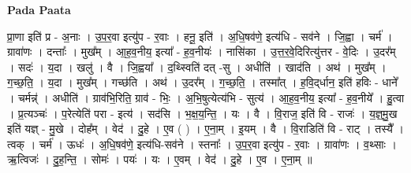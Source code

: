\documentclass[17pt]{extarticle}
\begin{document}
\textbf{Pada Paata} \newline

प्रा॒णा इति॑ प्र - अ॒नाः । उ॒प॒र॒वा इत्यु॑प - र॒वाः । हनू॒ इति॑ । अ॒धि॒षव॑णे॒ इत्य॑धि - सव॑ने । जि॒ह्वा । चर्म॑ । ग्रावा॑णः । दन्ताः᳚ । मुख᳚म् । आ॒ह॒व॒नीय॒ इत्या᳚ - ह॒व॒नीयः॑ । नासि॑का । उ॒त्त॒र॒वे॒दिरित्यु॑त्तर - वे॒दिः । उ॒दर᳚म् । सदः॑ । य॒दा । खलु॑ । वै । जि॒ह्वया᳚ । द॒थ्स्विति॑ दत् -सु । अधीति॑ । खाद॑ति । अथ॑ । मुख᳚म् । ग॒च्छ॒ति॒ । य॒दा । मुख᳚म् । गच्छ॑ति । अथ॑ । उ॒दर᳚म् । ग॒च्छ॒ति॒ । तस्मा᳚त् । ह॒वि॒द्‌र्धान॒ इति॑ हविः - धाने᳚ । चर्मन्न्॑ । अधीति॑ । ग्राव॑भि॒रिति॒ ग्राव॑ - भिः॒ । अ॒भि॒षुत्येत्य॑भि - सुत्य॑ । आ॒ह॒व॒नीय॒ इत्या᳚ - ह॒व॒नीये᳚ । हु॒त्वा । प्र॒त्यञ्चः॑ । प॒रेत्येति॑ परा - इत्य॑ । सद॑सि । भ॒क्ष॒य॒न्ति॒ । यः । वै । वि॒राज॒ इति॑ वि - राजः॑ । य॒ज्ञ्॒मु॒ख इति॑ यज्ञ् - मु॒खे । दोह᳚म् । वेद॑ । दु॒हे । ए॒व ( ) । ए॒ना॒म् । इ॒यम् । वै । वि॒राडिति॑ वि - राट् । तस्यै᳚ । त्वक् । चर्म॑ । ऊधः॑ । अ॒धि॒षव॑णे॒ इत्य॑धि-सव॑ने । स्तनाः᳚ । उ॒प॒र॒वा इत्यु॑प - र॒वाः । ग्रावा॑णः । व॒थ्साः । ऋ॒त्विजः॑ । दु॒ह॒न्ति॒ । सोमः॑ । पयः॑ । यः । ए॒वम् । वेद॑ । दु॒हे । ए॒व । ए॒ना॒म् ॥  \newline
\end{document}
